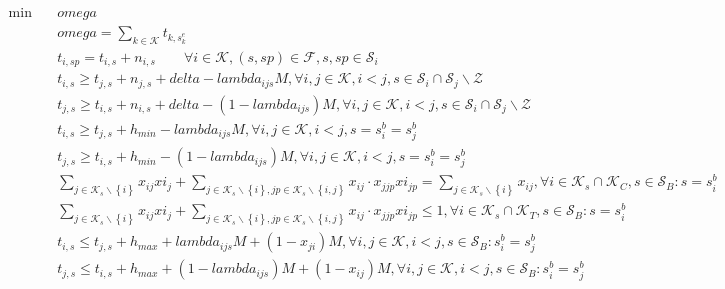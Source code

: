 \begin{align}
  \min\quad & \mathit{omega} \tag{eq\_0002\_a} \\
  & \mathit{omega} = \sum_{k \in \mathcal{K}} t_{k,s_{k}^{e}} \tag{eq\_0002\_b} \\
  & t_{i,sp} = t_{i,s} + n_{i,s} \qquad \forall i \in \mathcal{K}, (s,sp) \in \mathcal{F}, s,sp \in \mathcal{S}_{i} \tag{eq\_0003} \\
  & t_{i , s} \geq t_{j , s} + n_{j , s} + \mathit{delta} - \mathit{lambda}_{i j s} M , \forall i , j \in \mathcal{K} , i < j , s \in \mathcal{S}_{i} \cap \mathcal{S}_{j} \backslash \mathcal{Z} \tag{eq\_0004} \\
  & t_{j , s} \geq t_{i , s} + n_{i , s} + \mathit{delta} - \left(1 - \mathit{lambda}_{i j s}\right) M , \forall i , j \in \mathcal{K} , i < j , s \in \mathcal{S}_{i} \cap \mathcal{S}_{j} \backslash \mathcal{Z} \tag{eq\_0006} \\
  & t_{i , s} \geq t_{j , s} + h_{m i n} - \mathit{lambda}_{i j s} M , \forall i , j \in \mathcal{K} , i < j , s = s_{i}^{b} = s_{j}^{b} \tag{eq\_0007} \\
  & t_{j , s} \geq t_{i , s} + h_{m i n} - \left(1 - \mathit{lambda}_{i j s}\right) M , \forall i , j \in \mathcal{K} , i < j , s = s_{i}^{b} = s_{j}^{b} \tag{eq\_0009} \\
  & \sum_{j \in \mathcal{K}_{s} \backslash \left\{i\right\}} x_{i j} \mathit{xi}_{j} + \sum_{j \in \mathcal{K}_{s} \backslash \left\{i\right\}, jp \in \mathcal{K}_{s} \backslash \left\{i , j\right\}} x_{i j} \cdot x_{j jp} \mathit{xi}_{jp} = \sum_{j \in \mathcal{K}_{s} \backslash \left\{i\right\}} x_{i j} , \forall i \in \mathcal{K}_{s} \cap \mathcal{K}_{C} , s \in \mathcal{S}_{B} : s = s_{i}^{b} \tag{eq\_0011} \\
  & \sum_{j \in \mathcal{K}_{s} \backslash \left\{i\right\}} x_{i j} \mathit{xi}_{j} + \sum_{j \in \mathcal{K}_{s} \backslash \left\{i\right\}, jp \in \mathcal{K}_{s} \backslash \left\{i , j\right\}} x_{i j} \cdot x_{j jp} \mathit{xi}_{jp} \leq 1 , \forall i \in \mathcal{K}_{s} \cap \mathcal{K}_{T} , s \in \mathcal{S}_{B} : s = s_{i}^{b} \tag{eq\_0013} \\
  & t_{i , s} \leq t_{j , s} + h_{m a x} + \mathit{lambda}_{i j s} M + \left(1 - x_{j i}\right) M , \forall i , j \in \mathcal{K} , i < j , s \in \mathcal{S}_{B} : s_{i}^{b} = s_{j}^{b} \tag{eq\_0014} \\
  & t_{j , s} \leq t_{i , s} + h_{m a x} + \left(1 - \mathit{lambda}_{i j s}\right) M + \left(1 - x_{i j}\right) M , \forall i , j \in \mathcal{K} , i < j , s \in \mathcal{S}_{B} : s_{i}^{b} = s_{j}^{b} \tag{eq\_0016} \\

\end{align}
